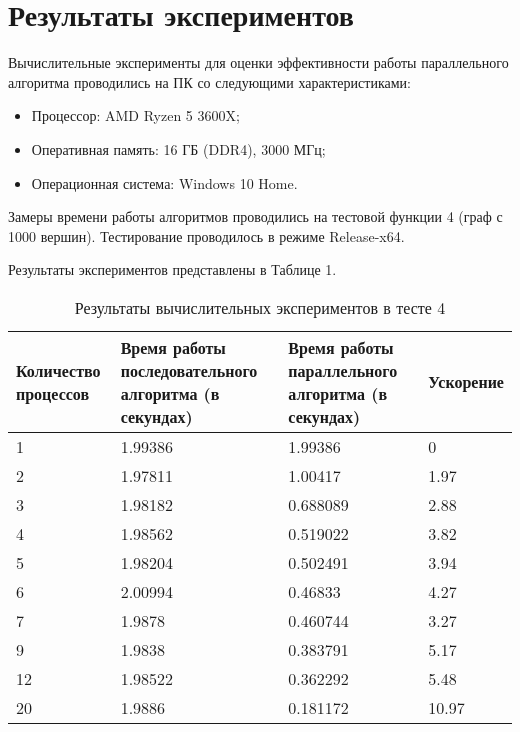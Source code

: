\documentclass{report}
\begin{document}
\newpage

\section*{Результаты экспериментов}
Вычислительные эксперименты для оценки эффективности работы параллельного алгоритма проводились на ПК со следующими характеристиками:
\begin{itemize}
\item Процессор: AMD Ryzen 5 3600X;
\item Оперативная память: 16 ГБ (DDR4), 3000 МГц;
\item Операционная система: Windows 10 Home.
\end{itemize}

\par Замеры времени работы алгоритмов проводились на тестовой функции 4 (граф с 1000 вершин). Тестирование проводилось в режиме Release-x64.

\par Результаты экспериментов представлены в Таблице 1.

\begin{table}[!h]
\caption{Результаты вычислительных экспериментов в тесте 4}
\centering
\begin{tabular}{| p{2cm} | p{3cm} | p{4cm} | p{2cm} |}
\hline
Количество процессов & Время работы последовательного алгоритма (в секундах) & Время работы параллельного алгоритма (в секундах) & Ускорение  \\[5pt]
\hline
1        &1.99386         &1.99386      &0        \\
2        &1.97811         &1.00417      &1.97        \\
3        &1.98182         &0.688089      &2.88        \\
4        &1.98562         &0.519022      &3.82        \\
5        &1.98204         &0.502491      &3.94       \\
6        &2.00994         &0.46833      &4.27        \\
7        &1.9878         &0.460744      &3.27        \\
9        &1.9838         &0.383791      &5.17 	    \\
12        &1.98522         &0.362292      &5.48 	  \\
20        &1.9886         &0.181172      &10.97 	  \\
\hline
\end{tabular}
\end{table}
\end{document}
